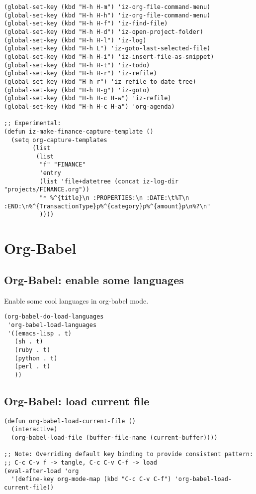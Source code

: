 \documentclass[10pt]{article}
\begin{document}
\begin{verbatim}
(global-set-key (kbd "H-h H-m") 'iz-org-file-command-menu)
(global-set-key (kbd "H-h H-h") 'iz-org-file-command-menu)
(global-set-key (kbd "H-h H-f") 'iz-find-file)
(global-set-key (kbd "H-h H-d") 'iz-open-project-folder)
(global-set-key (kbd "H-h H-l") 'iz-log)
(global-set-key (kbd "H-h L") 'iz-goto-last-selected-file)
(global-set-key (kbd "H-h H-i") 'iz-insert-file-as-snippet)
(global-set-key (kbd "H-h H-t") 'iz-todo)
(global-set-key (kbd "H-h H-r") 'iz-refile)
(global-set-key (kbd "H-h r") 'iz-refile-to-date-tree)
(global-set-key (kbd "H-h H-g") 'iz-goto)
(global-set-key (kbd "H-h H-c H-w") 'iz-refile)
(global-set-key (kbd "H-h H-c H-a") 'org-agenda)

;; Experimental:
(defun iz-make-finance-capture-template ()
  (setq org-capture-templates
        (list
         (list
          "f" "FINANCE"
          'entry
          (list 'file+datetree (concat iz-log-dir "projects/FINANCE.org"))
          "* %^{title}\n :PROPERTIES:\n :DATE:\t%T\n :END:\n%^{TransactionType}p%^{category}p%^{amount}p\n%?\n"
          ))))
\end{verbatim}

\section{Org-Babel}
\label{sec-10}
\subsection{Org-Babel: enable some languages}
\label{sec-10-1}

Enable some cool languages in org-babel mode.

\begin{verbatim}
(org-babel-do-load-languages
 'org-babel-load-languages
 '((emacs-lisp . t)
   (sh . t)
   (ruby . t)
   (python . t)
   (perl . t)
   ))
\end{verbatim}
\subsection{Org-Babel: load current file}
\label{sec-10-2}

\begin{verbatim}
(defun org-babel-load-current-file ()
  (interactive)
  (org-babel-load-file (buffer-file-name (current-buffer))))

;; Note: Overriding default key binding to provide consistent pattern:
;; C-c C-v f -> tangle, C-c C-v C-f -> load
(eval-after-load 'org
  '(define-key org-mode-map (kbd "C-c C-v C-f") 'org-babel-load-current-file))
\end{verbatim}
\end{document}
